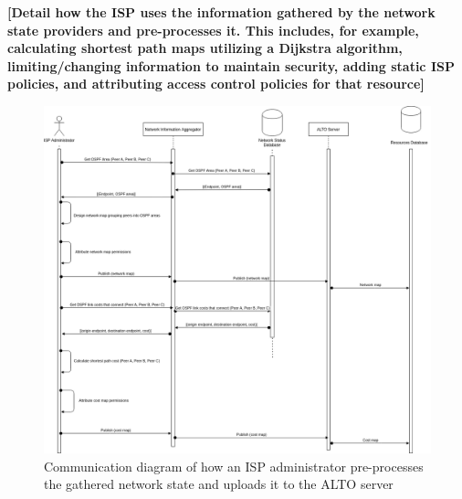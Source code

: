     \textbf{[Detail how the ISP uses the information gathered by the network state providers and pre-processes it. This includes, for example, calculating shortest path maps utilizing a Dijkstra algorithm, limiting/changing information to maintain security, adding static ISP policies, and attributing access control policies for that resource]}

\begin{figure}[!h]
        \centering
        \includegraphics[scale=0.3]{img/info-provisioning-isp.png}
        \caption{Communication diagram of how an ISP administrator pre-processes the gathered network state and uploads it to the ALTO server}
        \label{fig:architecture-network}
\end{figure}

